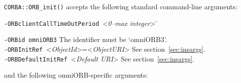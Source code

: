 \documentclass[11pt,twoside,a4paper]{book}
\newcommand{\op}[1]{\texttt{#1()}}
\newcommand{\cmdline}[1]{\texttt{#1}}
\begin{document}
\op{CORBA::ORB\_init} accepts the following standard command-line
arguments:

\begin{tabbing}
\cmdline{-ORBclientCallTimeOutPeriod }<\textit{0--max integer}> \=\kill

\cmdline{-ORBid omniORB3} \> The identifier must be `omniORB3'.\\

\cmdline{-ORBInitRef }<\textit{ObjectId}>=<\textit{ObjectURI}>
                          \> See section~\ref{sec:insargs}.\\

\cmdline{-ORBDefaultInitRef }<\textit{Default URI}>
                          \> See section~\ref{sec:insargs}.
\end{tabbing}


\noindent and the following omniORB-specific arguments:
\end{document}
